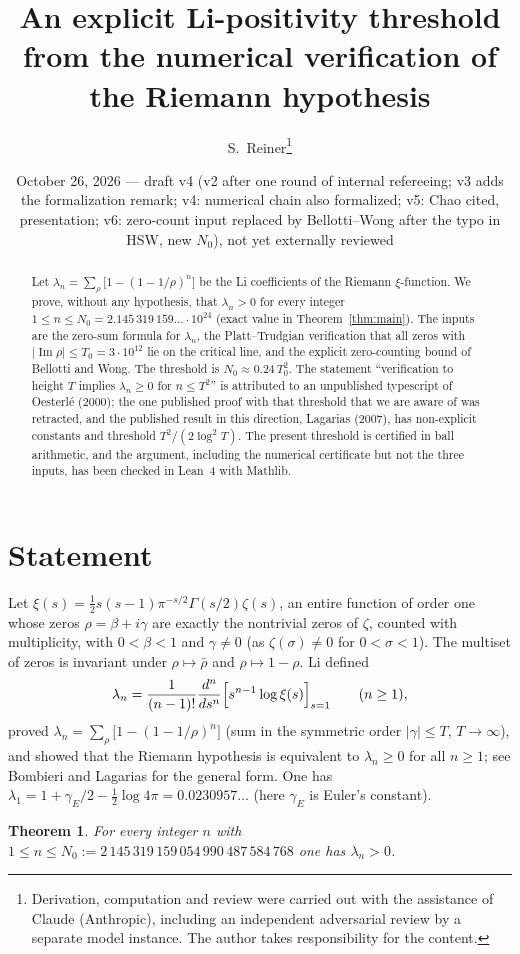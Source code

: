 \documentclass[11pt]{article}
\title{An explicit Li-positivity threshold from the numerical verification of the Riemann hypothesis}
\author{S.~Reiner\thanks{Derivation, computation and review were carried out with the assistance of Claude (Anthropic), including an independent adversarial review by a separate model instance. The author takes responsibility for the content.}}
\date{October 26, 2026 --- draft v4 (v2 after one round of internal refereeing; v3 adds the formalization remark; v4: numerical chain also formalized; v5: Chao cited, presentation; v6: zero-count input replaced by Bellotti--Wong after the typo in HSW, new $N_0$), not yet externally reviewed}
\newtheorem{theorem}{Theorem}
\theoremstyle{remark}
\renewcommand{\Im}{\operatorname{Im}}
\begin{document}
\maketitle

\begin{abstract}
Let $\lambda_n=\sum_\rho\bigl[1-(1-1/\rho)^n\bigr]$ be the Li coefficients of the Riemann $\xi$-function. We prove, without any hypothesis, that $\lambda_n>0$ for every integer $1\le n\le N_0=2.145\,319\,159\ldots\cdot10^{24}$ (exact value in Theorem~\ref{thm:main}). The inputs are the zero-sum formula for $\lambda_n$, the Platt--Trudgian verification that all zeros with $|\Im\rho|\le T_0=3\cdot10^{12}$ lie on the critical line, and the explicit zero-counting bound of Bellotti and Wong. The threshold is $N_0\approx0.24\,T_0^2$. The statement ``verification to height $T$ implies $\lambda_n\ge0$ for $n\le T^2$'' is attributed to an unpublished typescript of Oesterl\'e (2000); the one published proof with that threshold that we are aware of was retracted, and the published result in this direction, Lagarias (2007), has non-explicit constants and threshold $T^2/(2\log^2T)$. The present threshold is certified in ball arithmetic, and the argument, including the numerical certificate but not the three inputs, has been checked in Lean~4 with Mathlib.
\end{abstract}

\section{Statement}

Let $\xi(s)=\tfrac12 s(s-1)\pi^{-s/2}\Gamma(s/2)\zeta(s)$, an entire function of order one whose zeros $\rho=\beta+i\gamma$ are exactly the nontrivial zeros of $\zeta$, counted with multiplicity, with $0<\beta<1$ and $\gamma\ne0$ (as $\zeta(\sigma)\ne0$ for $0<\sigma<1$). The multiset of zeros is invariant under $\rho\mapsto\bar\rho$ and $\rho\mapsto1-\rho$. Li \cite{Li97} defined
\[
\lambda_n=\frac{1}{(n-1)!}\frac{d^n}{ds^n}\Bigl[s^{n-1}\log\xi(s)\Bigr]_{s=1}\qquad(n\ge1),
\]
proved $\lambda_n=\sum_\rho\bigl[1-(1-1/\rho)^n\bigr]$ (sum in the symmetric order $|\gamma|\le T$, $T\to\infty$), and showed that the Riemann hypothesis is equivalent to $\lambda_n\ge0$ for all $n\ge1$; see Bombieri and Lagarias \cite{BL99} for the general form. One has $\lambda_1=1+\gamma_{E}/2-\tfrac12\log4\pi=0.0230957\ldots$ (here $\gamma_E$ is Euler's constant).

\begin{theorem}\label{thm:main}
For every integer $n$ with $1\le n\le N_0:=2\,145\,319\,159\,054\,990\,487\,584\,768$ one has $\lambda_n>0$.
\end{theorem}
\end{document}
